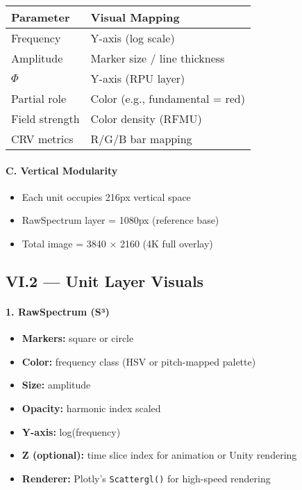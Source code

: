 \begin{center}
\begin{tabular}{|l|l|}
\hline
\textbf{Parameter} & \textbf{Visual Mapping} \\
\hline
Frequency & Y-axis (log scale) \\
Amplitude & Marker size / line thickness \\
$\Phi$ & Y-axis (RPU layer) \\
Partial role & Color (e.g., fundamental = red) \\
Field strength & Color density (RFMU) \\
CRV metrics & R/G/B bar mapping \\
\hline
\end{tabular}
\end{center}

\paragraph{C. Vertical Modularity}

\begin{itemize}
    \item Each unit occupies 216px vertical space
    \item RawSpectrum layer = 1080px (reference base)
    \item Total image = 3840 × 2160 (4K full overlay)
\end{itemize}

\subsection*{VI.2 — Unit Layer Visuals}

\paragraph{1. RawSpectrum (S³)}

\begin{itemize}
    \item \textbf{Markers:} square or circle
    \item \textbf{Color:} frequency class (HSV or pitch-mapped palette)
    \item \textbf{Size:} amplitude
    \item \textbf{Opacity:} harmonic index scaled
    \item \textbf{Y-axis:} log(frequency)
    \item \textbf{Z (optional):} time slice index for animation or Unity rendering
    \item \textbf{Renderer:} Plotly’s \texttt{Scattergl()} for high-speed rendering
\end{itemize}

